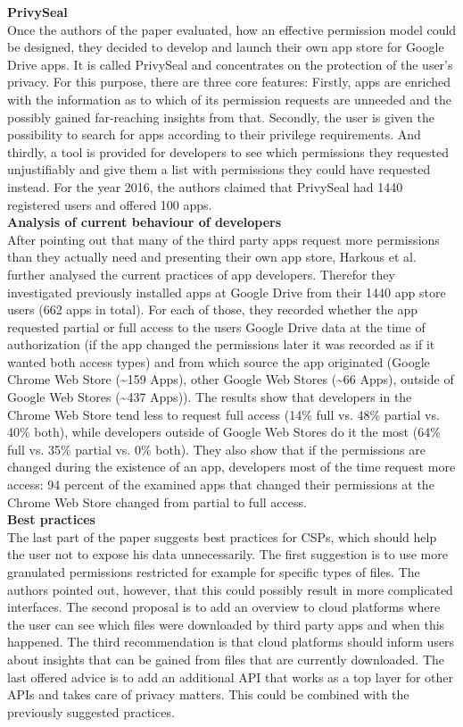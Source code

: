 \documentclass[11pt,twocolumn,a4paper,DIV=calc]{scrartcl}
\begin{document}
\textbf{PrivySeal} \\
Once the authors of the paper evaluated, how an effective permission model could be designed, they decided to develop and launch their own app store for Google Drive apps. It is called PrivySeal and concentrates on the protection of the user's privacy. For this purpose, there are three core features: Firstly, apps are enriched with the information as to which of its permission requests are unneeded and the possibly gained far-reaching insights from that. Secondly,  the user is given the possibility to search for apps according to their privilege requirements. And thirdly, a tool is provided for developers to see which permissions they requested unjustifiably and give them a list with permissions they could have requested instead. For the year 2016, the authors claimed that PrivySeal had 1440 registered users and offered 100 apps. \\

\textbf{Analysis of current behaviour of developers} \\
After pointing out that many of the third party apps request more permissions than they actually need and presenting their own app store, Harkous et al. further analysed the current practices of app developers. Therefor they investigated previously installed apps at Google Drive from their 1440 app store users (662 apps in total). For each of those, they recorded whether the app requested partial or full access to the users Google Drive data at the time of authorization (if the app changed the permissions later it was recorded as if it wanted both access types) and from which source the app originated (Google Chrome Web Store (\textasciitilde 159 Apps), other Google Web Stores (\textasciitilde 66 Apps), outside of Google Web Stores (\textasciitilde 437 Apps)). The results show that developers in the Chrome Web Store tend less to request full access (14\% full vs. 48\% partial vs. 40\% both), while developers outside of Google Web Stores do it the most (64\% full vs. 35\% partial vs. 0\% both). They also show that if the permissions are changed during the existence of an app, developers most of the time request more access: 94 percent of the examined apps that changed their permissions at the Chrome Web Store changed from partial to full access. \\ 

\textbf{Best practices} \\
The last part of the paper suggests best practices for CSPs, which should help the user not to expose his data unnecessarily. The first suggestion is to use more granulated permissions restricted for example for specific types of files. The authors pointed out, however, that this could possibly result in more complicated interfaces. The second proposal is to add an overview to cloud platforms where the user can see which files were downloaded by third party apps and when this happened. The third recommendation is that cloud platforms should inform users about insights that can be gained from files that are currently downloaded. The last offered advice is to add an additional API that works as a top layer for other APIs and takes care of privacy matters. This could be combined with the previously suggested practices. 
\end{document}
